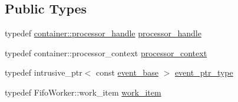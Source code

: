 \subsection*{Public Types}
\begin{DoxyCompactItemize}
\item 
typedef \mbox{\hyperlink{classboost_1_1statechart_1_1processor__container_a82ebbffaed81d7b99119ae0e892f6411}{container\+::processor\+\_\+handle}} \mbox{\hyperlink{classboost_1_1statechart_1_1fifo__scheduler_ada526939c16c4f8118bc4d7bbf09ad7d}{processor\+\_\+handle}}
\item 
typedef container\+::processor\+\_\+context \mbox{\hyperlink{classboost_1_1statechart_1_1fifo__scheduler_a7d1abb1c5cede2b8c42c59d76c301f5b}{processor\+\_\+context}}
\item 
typedef intrusive\+\_\+ptr$<$ const \mbox{\hyperlink{classboost_1_1statechart_1_1event__base}{event\+\_\+base}} $>$ \mbox{\hyperlink{classboost_1_1statechart_1_1fifo__scheduler_a30789ce36779246ebbaf43665289226a}{event\+\_\+ptr\+\_\+type}}
\item 
typedef Fifo\+Worker\+::work\+\_\+item \mbox{\hyperlink{classboost_1_1statechart_1_1fifo__scheduler_a72ed2c30a2fa295c2e6909ff09754998}{work\+\_\+item}}
\end{DoxyCompactItemize}
